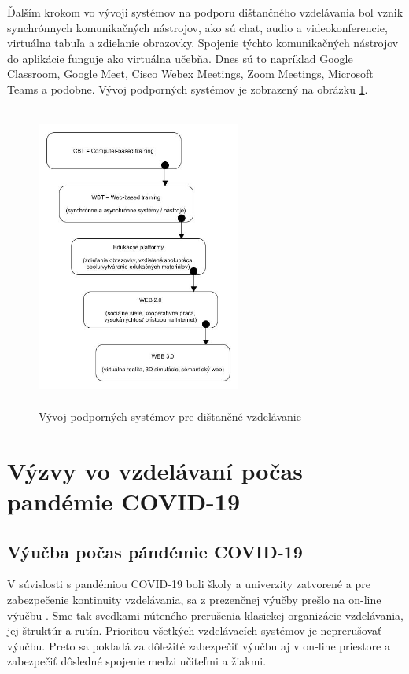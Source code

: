 \documentclass[10pt,oneside,slovak,a4paper]{article}
\begin{document}
Ďalším krokom vo vývoji systémov na podporu dištančného vzdelávania bol vznik synchrónnych komunikačných nástrojov, ako sú chat, audio a videokonferencie, virtuálna tabuľa a zdieľanie obrazovky.
Spojenie týchto komunikačných nástrojov do aplikácie funguje ako virtuálna učebňa.
Dnes sú to napríklad Google Classroom, Google Meet, Cisco Webex Meetings, Zoom Meetings, Microsoft Teams a podobne.
Vývoj podporných systémov je zobrazený na obrázku \ref{Vyvoj_podp_sys_DE}.

\begin{figure}[h]
	\centering
	\includegraphics[scale=0.15, height=100mm,width=0.6\textwidth]{Dev_Of_SupSys_DE.jpg}
	\caption{Vývoj podporných systémov pre dištančné vzdelávanie\cite{WiktorzakKotowski}}
	\label{Vyvoj_podp_sys_DE}
\end{figure}

\section{Výzvy vo vzdelávaní počas pandémie COVID-19}
\subsection{Výučba počas pándémie COVID-19} %
V súvislosti s pandémiou COVID-19 boli školy a univerzity zatvorené a pre zabezpečenie kontinuity vzdelávania, sa z prezenčnej výučby prešlo na on-line výučbu \cite{covid19}.
Sme tak svedkami núteného prerušenia klasickej organizácie vzdelávania, jej štruktúr a rutín. Prioritou všetkých vzdelávacích systémov je neprerušovať výučbu.
Preto sa pokladá za dôležité zabezpečiť výučbu aj v on-line priestore a zabezpečiť dôsledné spojenie medzi učiteľmi a žiakmi. 
\end{document}
